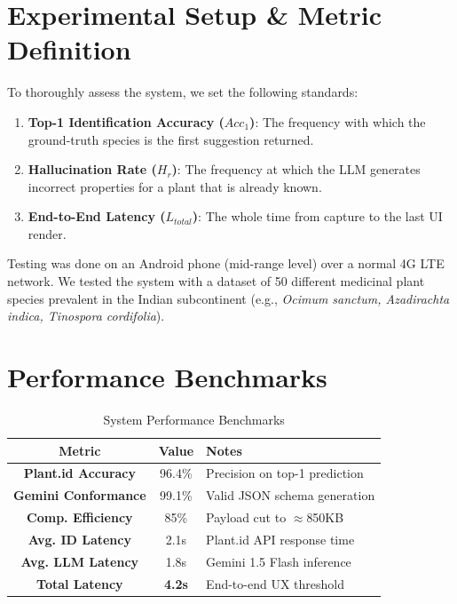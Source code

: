 \documentclass[12pt, a4paper]{report}
\begin{document}
\newpage
\section{Experimental Setup \& Metric Definition}
To thoroughly assess the system, we set the following standards:
\begin{enumerate}
    \item \textbf{Top-1 Identification Accuracy ($Acc_1$)}: The frequency with which the ground-truth species is the first suggestion returned.
    \item \textbf{Hallucination Rate ($H_r$)}: The frequency at which the LLM generates incorrect properties for a plant that is already known.
    \item \textbf{End-to-End Latency ($L_{total}$)}: The whole time from capture to the last UI render.
\end{enumerate}

Testing was done on an Android phone (mid-range level) over a normal 4G LTE network. We tested the system with a dataset of 50 different medicinal plant species prevalent in the Indian subcontinent (e.g., \textit{Ocimum sanctum, Azadirachta indica, Tinospora cordifolia}).

\section{Performance Benchmarks}

\begin{table}[htbp]
\caption{System Performance Benchmarks}
\begin{center}
\begin{tabular}{|c|c|l|}
\hline
\textbf{Metric} & \textbf{Value} & \textbf{Notes} \\
\hline
\textbf{Plant.id Accuracy} & 96.4\% & Precision on top-1 prediction \\
\hline
\textbf{Gemini Conformance} & 99.1\% & Valid JSON schema generation \\
\hline
\textbf{Comp. Efficiency} & 85\% & Payload cut to $\approx$850KB \\
\hline
\textbf{Avg. ID Latency} & 2.1s & Plant.id API response time \\
\hline
\textbf{Avg. LLM Latency} & 1.8s & Gemini 1.5 Flash inference \\
\hline
\textbf{Total Latency} & \textbf{4.2s} & End-to-end UX threshold \\
\hline
\end{tabular}
\end{center}
\end{table}
\end{document}
